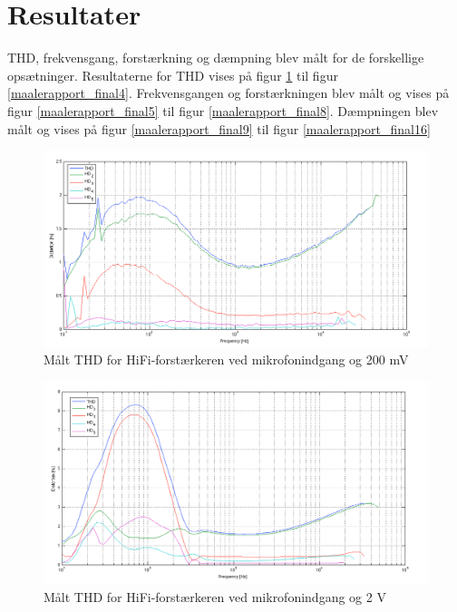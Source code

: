 \section*{Resultater}

THD, frekvensgang, forstærkning og dæmpning blev målt for de forskellige opsætninger. Resultaterne for THD vises på figur \ref{maalerapport_final1} til figur \ref{maalerapport_final4}. Frekvensgangen og forstærkningen blev målt og vises på figur \ref{maalerapport_final5} til figur \ref{maalerapport_final8}. Dæmpningen blev målt og vises på figur \ref{maalerapport_final9} til figur \ref{maalerapport_final16}

\begin{figure}[h]
\centering
\includegraphics[width=\textwidth]{maalerapporter/final/mic/final_mic_3,16mv_thd.png}
\caption{Målt THD for HiFi-forstærkeren ved mikrofonindgang og 200 mV}
\label{maalerapport_final1}
\end{figure}

\begin{figure}[h]
\centering
\includegraphics[width=\textwidth]{maalerapporter/final/mic/final_mic_31,6mv_thd.png}
\caption{Målt THD for HiFi-forstærkeren ved mikrofonindgang og 2 V}
\label{maalerapport_final2}
\end{figure}

